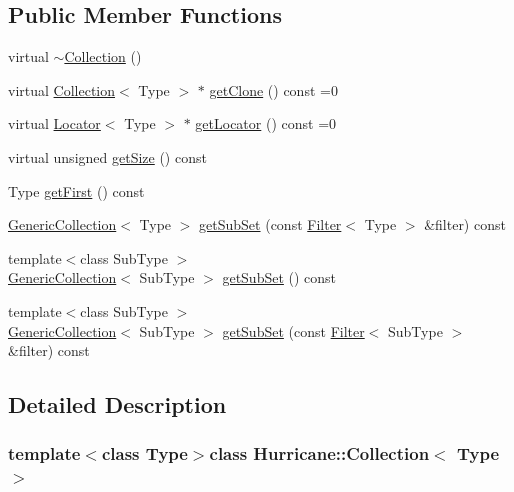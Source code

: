\subsection*{Public Member Functions}
\begin{DoxyCompactItemize}
\item 
virtual \hyperlink{classHurricane_1_1Collection_aafcf8e05658e245b2a762baa7a59f281}{$\sim$\-Collection} ()
\item 
virtual \hyperlink{classHurricane_1_1Collection}{Collection}$<$ Type $>$ $\ast$ \hyperlink{classHurricane_1_1Collection_ac75b91d3952b36e14f21174958523924}{get\-Clone} () const =0
\item 
virtual \hyperlink{classHurricane_1_1Locator}{Locator}$<$ Type $>$ $\ast$ \hyperlink{classHurricane_1_1Collection_a48fd1a0a2b6d2530a87e22ba65aa3152}{get\-Locator} () const =0
\item 
virtual unsigned \hyperlink{classHurricane_1_1Collection_a508dc393f2bfc016fbdd79ecdeac770a}{get\-Size} () const 
\item 
Type \hyperlink{classHurricane_1_1Collection_aa117bff1bf570e017f4cf9066d581c70}{get\-First} () const 
\item 
\hyperlink{classHurricane_1_1GenericCollection}{Generic\-Collection}$<$ Type $>$ \hyperlink{classHurricane_1_1Collection_a7a65ac0e7cb1a33b01b1179a5da093b6}{get\-Sub\-Set} (const \hyperlink{classHurricane_1_1Filter}{Filter}$<$ Type $>$ \&filter) const 
\item 
{\footnotesize template$<$class Sub\-Type $>$ }\\\hyperlink{classHurricane_1_1GenericCollection}{Generic\-Collection}$<$ Sub\-Type $>$ \hyperlink{classHurricane_1_1Collection_a735ad58371a00207d037ef49d4c16035}{get\-Sub\-Set} () const 
\item 
{\footnotesize template$<$class Sub\-Type $>$ }\\\hyperlink{classHurricane_1_1GenericCollection}{Generic\-Collection}$<$ Sub\-Type $>$ \hyperlink{classHurricane_1_1Collection_a2cc395b34337559d37ffe2073459fb0b}{get\-Sub\-Set} (const \hyperlink{classHurricane_1_1Filter}{Filter}$<$ Sub\-Type $>$ \&filter) const 
\end{DoxyCompactItemize}


\subsection{Detailed Description}
\subsubsection*{template$<$class Type$>$class Hurricane\-::\-Collection$<$ Type $>$}

